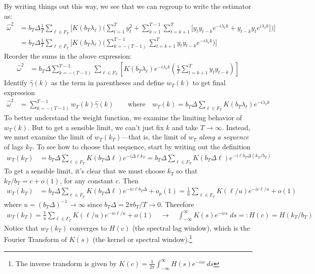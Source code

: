 \documentclass[12pt]{article}
\theoremstyle{plain}
\theoremstyle{definition}
\theoremstyle{remark}
\newcommand{\ra}{\rightarrow}
\begin{document}
By writing things out this way, we see that we can regroup to write the
estimator as:
\begin{align*}
  \hat{\omega}^2
  &=
  b_T
  \Delta
  \frac{1}{T}
  \sum_{\ell\in F_T}
  \bigg[
    K(b_T\lambda_\ell)
  \bigg(
  \sum_{t=1}^T
  y_t^2
  +
  \sum_{k=1}^{T-1}
  \sum_{t=k+1}^T
  \big[
  y_ty_{t-k}
  e^{-i\lambda_\ell k}
  +
  y_{t-k}y_{t}
  e^{i\lambda_\ell k}
  \big]
  \bigg)
  \bigg]
  \\
  &=
  b_T
  \Delta
  \frac{1}{T}
  \sum_{\ell\in F_T}
  \bigg[
    K(b_T\lambda_\ell)
  \bigg(
  \sum_{k=-(T-1)}^{T-1}
  \sum_{t=k+1}^T
  y_ty_{t-k}
  e^{-i\lambda_\ell k}
  \bigg)
  \bigg]
\end{align*}
Reorder the sums in the above expression:
\begin{align*}
  \hat{\omega}^2
  &=
  b_T
  \Delta
  \sum_{k=-(T-1)}^{T-1}
  \sum_{\ell\in F_T}
  \left[
    K(b_T\lambda_\ell)
  e^{-i\lambda_\ell k}
  \left(
  \frac{1}{T}
  \sum_{t=k+1}^T
  y_ty_{t-k}
  \right)
  \right]
\end{align*}
Identify $\hat{\gamma}(k)$ as the term in parentheses and define
$w_T(k)$ to get final expression
\begin{align*}
  \hat{\omega}^2
  &=
  \sum_{k=-(T-1)}^{T-1}
  w_T(k)
  \hat{\gamma}(k)
  \qquad\text{where}\quad
  w_T(k)
  =
  b_T
  \Delta
  \sum_{\ell\in F_T}
  K(b_T\lambda_\ell)
  e^{-i\lambda_\ell k}
\end{align*}
To better understand the weight function, we examine the limiting
behavior of $w_T(k)$.
But to get a sensible limit, we can't just fix $k$ and take
$T\ra\infty$.
Instead, we must examine the limit of $w_T(k_T)$---that is, the limit of
$w_T$ \emph{along a sequence} of lags $k_T$.
To see how to choose that sequence, start by writing out the definition
\begin{align*}
  w_T(k_T)
  &=
  b_T
  \Delta
  \sum_{\ell\in F_T}
  K(b_T\Delta \ell)
  e^{-i\Delta \ell k_T}
  =
  b_T
  \Delta
  \sum_{\ell\in F_T}
  K(b_T\Delta \ell)
  e^{-i\ell b_T\Delta (k_T/b_T)}
\end{align*}
To get a sensible limit, it's clear that we must choose
$k_T$ so that $k_T/b_T=c+o(1)$,
for any constant $c$.
Then
\begin{align*}
  w_T(k_T)
  &=
  b_T
  \Delta
  \sum_{\ell\in F_T}
  K(b_T\Delta \ell)
  e^{-ic\ell b_T\Delta}
  +
  o_p(1)
  =
  \frac{1}{u}
  \sum_{\ell\in F_T}
  K(\ell/u)
  e^{-ic\ell/u}
  +
  o(1)
\end{align*}
where $u=(b_T\Delta)^{-1}\ra\infty$ since $b_T\Delta=2\pi b_T/T\ra 0$.
Therefore
\begin{align*}
  w_T(k_T)
  =
  \frac{1}{u}
  \sum_{\ell\in F_T}
  K(\ell/u)
  e^{-ic\ell/u}
  +
  o(1)
  \quad\ra\quad
  \int_{-\infty}^\infty
  K(s)
  e^{-ics}
  \;ds
  =: H(c) = H(k_T/b_T)
\end{align*}
Notice that $w_T(k_T)$ converges to $H(c)$ (the spectral lag window),
which is the Fourier Transform of $K(s)$ (the kernel or spectral
window).\footnote{%
  The inverse transform is given by
  $K(c)=\frac{1}{2\pi}\int_{-\infty}^\infty H(s)e^{-isc}\,ds$
}
\end{document}
